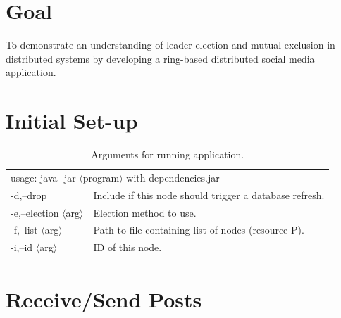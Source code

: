 \documentclass[12pt]{article}
\begin{document}
\begin{titlepage}

\vfill %

\end{titlepage}

\section*{Goal}

To demonstrate an understanding of leader election and mutual exclusion in distributed systems by developing a ring-based distributed social media application.

\tableofcontents
\newpage

\setcounter{page}{1} 

\section{Initial Set-up}


\renewcommand{\arraystretch}{1.5}
\begin{table}[!ht]
\centering
\begin{tabular}{ll}
\multicolumn{2}{l}{usage: java -jar $\langle$program$\rangle$-with-dependencies.jar}
\\ 

 -d,--drop           &  Include if this node should trigger a database refresh. \\
 -e,--election $\langle$arg$\rangle$ &  Election method to use. \\
 -f,--list $\langle$arg$\rangle$     &  Path to file containing list of nodes (resource P). \\
 -i,--id $\langle$arg$\rangle$       &  ID of this node. 
\end{tabular}
\caption{Arguments for running application.}
\label{tbl:arguments}
\end{table}


\section{Receive/Send Posts}
\end{document}
